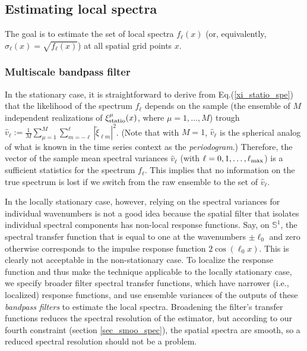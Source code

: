 \documentclass[12pt]{article}
\renewcommand{\S}{{\mathbb S}}
\newcommand{\ie}{i.e., }
\begin{document}
\subsection{Estimating local spectra}
\label{sec_estm_spec}


The goal is to estimate the set of local spectra $f_\ell(x)$ 
(or, equivalently, $\sigma_\ell(x)=\sqrt{f_\ell(x)}$)
at all spatial grid points $x$.



\subsubsection{Multiscale bandpass filter}
\label{sec_estm_spec_apch}




In the stationary case, it is straightforward to derive from Eq.(\ref{xi_statio_spe}) that 
 the likelihood of the spectrum $f_\ell$ depends on the sample
(the ensemble of $M$ independent realizations of $\xi_{\rm statio}^\mu (x)$, where $\mu=1,\dots,M$)
trough 
$\widehat v_\ell := \frac{1}{M}\sum_{\mu=1}^M \sum_{m=-\ell}^\ell |\widetilde\xi_{\ell m}|^2$. 
(Note that with $M=1$,  $\widehat v_\ell$ is the spherical analog of what is 
known in the time series context as the {\em periodogram}.)
Therefore, the vector of the sample mean  spectral variances $\widehat v_\ell$ (with $\ell=0,1,\dots,\ell_{\rm max}$)
is a sufficient statistics for the spectrum $f_\ell$.
This implies that  no information on the true spectrum is lost if we switch from the raw ensemble
to the set of  $\widehat v_\ell$.

In the locally stationary case, however, relying on the spectral variances for individual
wavenumbers is not a good idea because the spatial filter that isolates individual spectral 
components has  non-local response functions. Say, on $\S^1$, the spectral transfer function that
is equal to one at the wavenumbers $\pm\ell_0$ and zero otherwise corresponds to the impulse response function
$2\cos(\ell_0 x)$. 
This is clearly not acceptable in the non-stationary case.
To localize the response function and
thus make the technique applicable to the locally stationary case, we specify broader
filter spectral transfer functions, which have narrower (\ie localized) response functions,
and use ensemble variances of the outputs of these {\em bandpass filters} to estimate
the local spectra.
Broadening the filter's transfer functions 
reduces the spectral resolution of the estimator, 
but according to our fourth constraint (section \ref{sec_smoo_spec}),
the spatial spectra are smooth, so a reduced spectral resolution should not be a problem.
\end{document}
